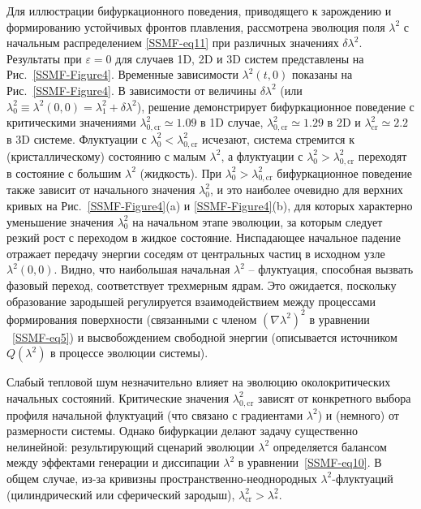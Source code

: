 Для иллюстрации бифуркационного поведения, приводящего к зарождению и формированию устойчивых фронтов плавления, рассмотрена эволюция поля $\lambda^2$ с начальным распределением \eqref{SSMF-eq11} при различных значениях $ \delta\lambda^2$.
Результаты при $ \varepsilon = 0 $ для случаев 1D, 2D и 3D систем представлены на Рис.~\ref{SSMF-Figure4}.
Временные зависимости $\lambda^2(t, 0) $ показаны на Рис.~\ref{SSMF-Figure4}.
В зависимости от величины $\delta\lambda^2$ (или $\lambda_0^2 \equiv \lambda^2(0,0)=\lambda_1^2 + \delta \lambda^2$), решение демонстрирует бифуркационное поведение с критическими значениями $\lambda^2_{0,\mathrm{cr}} \simeq 1.09$ в 1D случае, $\lambda^2_{0,\mathrm{cr}}\simeq 1.29$ в 2D и $\lambda^2_{\mathrm{cr}}\simeq 2.2$ в 3D системе.
Флуктуации с $ \lambda_0 ^ 2 <\lambda ^ 2_ {0, \mathrm{cr}} $ исчезают, система стремится к (кристаллическому) состоянию с малым $\lambda^2$, а флуктуации с $\lambda_0^2> \lambda^2_{0, \mathrm{cr}}$ переходят в состояние с большим $\lambda^2$ (жидкость).
При $\lambda_0^2>\lambda^2_{0, \mathrm{cr}}$ бифуркационное поведение также зависит от начального значения $\lambda_0^2$, и это наиболее очевидно для верхних кривых на Рис.~\ref{SSMF-Figure4}(a) и \ref{SSMF-Figure4}(b), для которых характерно уменьшение значения $ \lambda_0^2 $ на начальном этапе эволюции, за которым следует резкий рост с переходом в жидкое состояние.
Ниспадающее начальное падение отражает передачу энергии соседям от центральных частиц в исходном узле $\lambda^2 (0,0)$. Видно, что наибольшая начальная $\lambda ^ 2$ -- флуктуация, способная вызвать фазовый переход, соответствует трехмерным ядрам. Это ожидается, поскольку образование зародышей регулируется взаимодействием между процессами формирования поверхности (связанными с членом $(\nabla \lambda ^ 2) ^ 2$ в уравнении ~\eqref{SSMF-eq5}) и высвобождением свободной энергии (описывается источником $Q (\lambda ^ 2)$ в процессе эволюции системы).

Слабый тепловой шум незначительно влияет на эволюцию околокритических начальных состояний.
Критические значения $\lambda^2_{0,\mathrm{cr}}$ зависят от конкретного выбора профиля начальной флуктуаций (что связано с градиентами $\lambda^2$) и (немного) от размерности системы.
Однако бифуркации делают задачу существенно нелинейной:
результирующий сценарий эволюции $\lambda^2$ определяется балансом между эффектами генерации и диссипации $\lambda^2$ в уравнении~\eqref{SSMF-eq10}.
В общем случае, из-за кривизны пространственно-неоднородных $\lambda^2$-флуктуаций (цилиндрический или сферический зародыш), $\lambda_{\mathrm{cr}}^2 > \lambda_\ast^2$.





